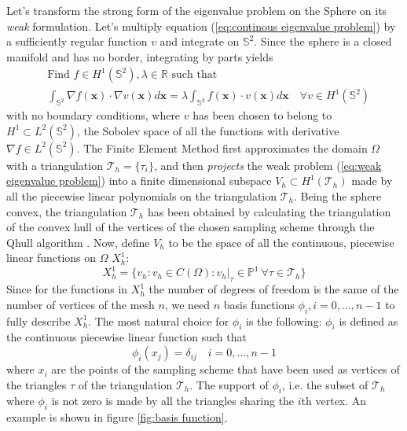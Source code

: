 Let's transform the strong form of the eigenvalue problem on the Sphere on its \textit{weak} formulation. Let's multiply equation (\ref{eq:continous eigenvalue problem}) by a sufficiently regular function $v$ and integrate on $\mathbb S^2$. Since the sphere is a closed manifold and has no border, integrating by parts yields
\begin{equation}\label{eq:weak eigenvalue problem}
\begin{split}
&\text{Find } f\in H^1(\mathbb S^2), \lambda\in\mathbb R\text{ such that }\\ 
&\int_{\mathbb S^2} \nabla f(\mathbf x)\cdot\nabla v(\mathbf x) d\mathbf x = \lambda \int_{\mathbb S^2} f(\mathbf x)\cdot v(\mathbf x)d\mathbf x\quad \forall v\in H^1(\mathbb S^2)
\end{split}
\end{equation}
with no boundary conditions, where $v$ has been chosen to belong to $H^1\subset L^2(\mathbb S^2)$, the Sobolev space of all the functions with derivative $\nabla f\in L^2(\mathbb S^2)$. The Finite Element Method first approximates the domain $\Omega$ with a triangulation $\mathcal T_h=\{ \tau_i \}$, and then \textit{projects} the weak problem (\ref{eq:weak eigenvalue problem}) into a finite dimensional subspace $V_h\subset H^1(\mathcal T_h)$ made by all the piecewise linear polynomials on the triangulation $\mathcal T_h$. Being the sphere convex, the triangulation $\mathcal T_h$ has been obtained by calculating the triangulation of the convex hull of the vertices of the chosen sampling scheme through the Qhull algorithm \cite{Barber96thequickhull}. Now, define $V_h$ to be the space of all the continuous, piecewise linear functions on $\Omega$ $X_h^1$:
$$X_h^{1}=\{v_h: v_h\in C(\Omega): \left.v_h\right|_{\tau}\in\mathbb P^1\  \forall \tau\in \mathcal T_h\}$$ 
Since for the functions in $X_h^1$ the number of degrees of freedom is the same of the number of vertices of the mesh $n$, we need  $n$ basis functions $\phi_i, i=0,...,n-1$ to fully describe $X_h^{1}$. The most natural choice for $\phi_i$ is the following: $\phi_i$ is defined as the continuous piecewise linear function such that 
$$
\phi_i(x_j) = \delta_{ij}\quad i=0,...,n-1
$$
where $x_i$ are the points of the sampling scheme that have been used as vertices of the triangles $\tau$ of the triangulation $\mathcal T_h$. The support of $\phi_i$, i.e. the subset of $\mathcal T_h$ where $\phi_i$ is not zero is made by all the triangles sharing the $i$th vertex. An example is shown in figure \ref{fig:basis function}.

